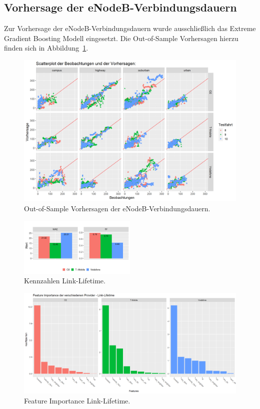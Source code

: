 \subsection{Vorhersage der eNodeB-Verbindungsdauern}

Zur Vorhersage der eNodeB-Verbindungsdauern wurde ausschlie{\ss}lich das Extreme Gradient Boosting Modell
eingesetzt. Die Out-of-Sample Vorhersagen hierzu finden sich in Abbildung~\ref{fig:link-lifetime-predictions}.
\begin{figure}
    \centering
    \includegraphics[width=\textwidth]{abbildungen/predictions_linklifetime}
    \caption{Out-of-Sample Vorhersagen der eNodeB-Verbindungsdauern.}
    \label{fig:link-lifetime-predictions}
\end{figure}

\begin{figure}
    \centering
    \includegraphics[width=0.5\textwidth]{abbildungen/kennzahlen_linklifetime}
    \caption{Kennzahlen Link-Lifetime.}
    \label{fig:kennzahlen-link-lifetime}
\end{figure}

\begin{figure}
    \centering
    \includegraphics[width=\textwidth]{abbildungen/feature_importance_linklifetime}
    \caption{Feature Importance Link-Lifetime.}
    \label{fig:feature-importance-link-lifetime}
\end{figure}
